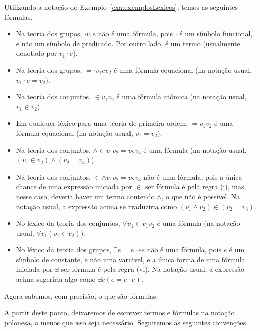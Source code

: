 \begin{example}\label{exa:formulasPrimeiraOrdem}Utilizando a notação do Exemplo~\ref{exa:exemplosLexicos}, temos as seguintes fórmulas.
    \begin{itemize}
        \item Na teoria dos grupos, $\cdot v_1 e$ não é uma fórmula, pois $\cdot$ é um símbolo funcional, e não um símbolo de predicado.
        Por outro lado, é um termo (usualmente denotado por $v_1 \cdot e$).
        \item Na teoria dos grupos, ${=} {\cdot} v_1 e v_2$ é uma fórmula equacional (na notação usual, $v_1 \cdot e = v_2$).
        \item Na teoria dos conjuntos, ${\in} v_1 v_2$ é uma fórmula atômica (na notação usual, $v_1 \in v_2$).
        \item Em qualquer léxico para uma teoria de primeira ordem, ${=} v_1 v_2$ é uma fórmula equacional (na notação usual, $v_1 = v_2$).
        \item Na teoria dos conjuntos, ${\wedge} {\in} v_1 v_2 {=} v_2 v_3$ é uma fórmula (na notação usual, $(v_1 \in v_2) \wedge (v_2 = v_3)$).
        \item Na teoria dos conjuntos, ${\in}{\wedge} v_1 v_2 {=} v_2 v_3$ não é uma fórmula, pois a única chance de uma expressão iniciada por $\in$ ser fórmula é pela regra (i), mas, nesse caso, deveria haver um termo contendo $\wedge$, o que não é possível.
        Na notação usual, a expressão acima se traduziria como $(v_1 \wedge v_2) \in (v_2 = v_3)$.
        \item No léxico da teoria dos conjuntos, $\forall v_1 {\in} v_1 v_2$ é uma fórmula (na notação usual, $\forall v_1 (v_1 \in v_2)$).
        \item No léxico da teoria dos grupos, $\exists e {=} e {\cdot} e e$ não é uma fórmula, pois $e$ é um símbolo de constante, e não uma variável, e a única forma de uma fórmula iniciada por $\exists$ ser fórmula é pela regra (vi).
        Na notação usual, a expressão acima sugeriria algo como $\exists e (e = e \cdot e)$.
    \end{itemize}
\end{example}

Agora sabemos, com precisão, o que são fórmulas.

A partir deste ponto, deixaremos de escrever termos e fórmulas na notação polonesa, a menos que isso seja necessário.
Seguiremos as seguintes convenções.

